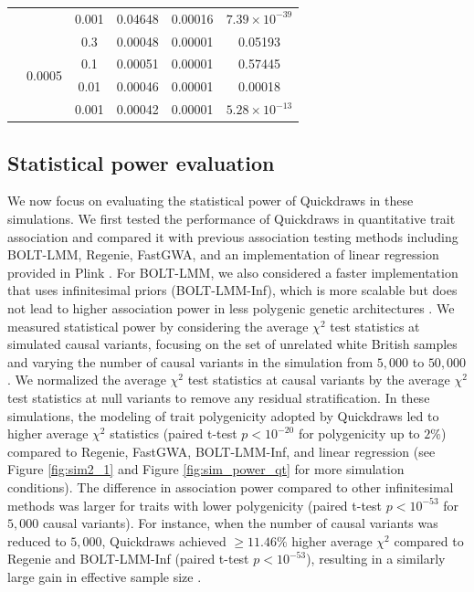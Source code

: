 \begin{table}[h!]
{\begin{tabular}{|c|c|c|c|c|c|}
                                     &                        & 0.001 & 0.04648 & 0.00016 & $7.39 \times 10^{-39}$ \\ \cline{2-6}
                                     & \multirow{4}{*}{0.0005}& 0.3   & 0.00048 & 0.00001 & 0.05193 \\ \cline{3-6}
                                     &                        & 0.1   & 0.00051 & 0.00001 & 0.57445 \\ \cline{3-6}
                                     &                        & 0.01  & 0.00046 & 0.00001 & 0.00018 \\ \cline{3-6}
                                     &                        & 0.001 & 0.00042 & 0.00001 & $5.28 \times 10^{-13}$ \\ \hline
\end{tabular}
}
\label{tab:fpr_simulations}
\end{table}

\endgroup %

\clearpage

\subsection{Statistical power evaluation}
We now focus on evaluating the statistical power of Quickdraws in these simulations.
%
We first tested the performance of Quickdraws in quantitative trait association and compared it with previous association testing methods including BOLT-LMM, Regenie, FastGWA, and an implementation of linear regression provided in Plink \cite{purcell2007plink,chang2015second}.
%
For BOLT-LMM, we also considered a faster implementation that uses infinitesimal priors (BOLT-LMM-Inf), which is more scalable but does not lead to higher association power in less polygenic genetic architectures \cite{loh2015efficient,loh2018mixed}.
%
We measured statistical power by considering the average $\chi^2$ test statistics at simulated causal variants, focusing on the set of unrelated white British samples and varying the number of causal variants in the simulation from $5{,}000$ to $50{,}000$ \cite{zeng2018signatures}.
%
We normalized the average $\chi^2$ test statistics at causal variants by the average $\chi^2$ test statistics at null variants to remove any residual stratification.
%
In these simulations, the modeling of trait polygenicity adopted by Quickdraws led to higher average $\chi^2$ statistics (paired t-test $p < 10^ {-20}$ for polygenicity up to $2\%$) compared to Regenie, FastGWA, BOLT-LMM-Inf, and linear regression (see Figure \ref{fig:sim2_1} and Figure \ref{fig:sim_power_qt} for more simulation conditions).
%
The difference in association power compared to other infinitesimal methods was larger for traits with lower polygenicity (paired t-test $p < 10^{-53}$ for $5{,}000$ causal variants).
%
For instance, when the number of causal variants was reduced to ${5{,}000}$, Quickdraws achieved $\geq 11.46\%$ higher average $\chi^2$ compared to Regenie and BOLT-LMM-Inf (paired t-test $p < 10^{-53}$), resulting in a similarly large gain in effective sample size \cite{yang2011genomic}.
%

